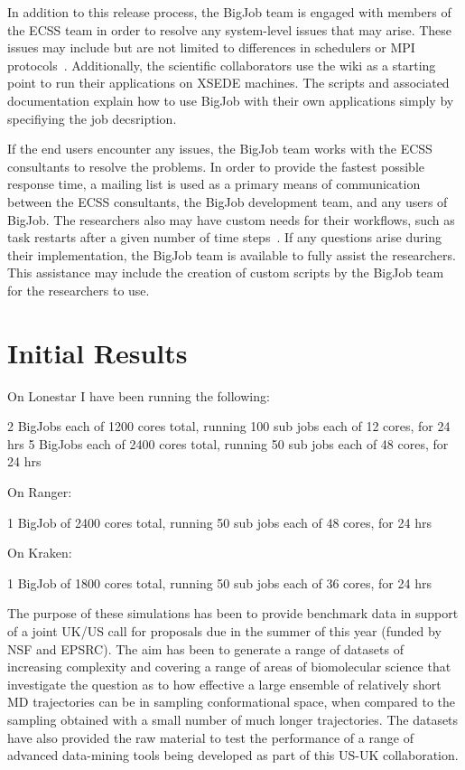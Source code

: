 \documentclass{sig-alternate}
\begin{document}
In addition to this release process, the BigJob team is engaged with members
of the ECSS team in order to resolve any system-level issues that may arise.
These issues may include but are not limited to differences in schedulers or MPI
protocols~. Additionally, the scientific collaborators use the wiki as a
starting point to run their applications on XSEDE machines. The scripts and
associated documentation explain how to use BigJob with their own applications
simply by specifiying the job decsription.~

If the end users encounter any issues, the BigJob team works with the ECSS
consultants to resolve the problems. In order to provide the fastest possible
response time, a mailing list is used as a primary means of communication
between the ECSS consultants, the BigJob development team, and any users of
BigJob. The researchers also may have custom needs for their workflows, such as
task restarts after a given number of time steps~. If any questions arise during their implementation, the BigJob
team is available to fully assist the researchers. This assistance may include
the creation of custom scripts by the BigJob team for the researchers to use.


\section{Initial Results} 

On Lonestar I have been running the following:

2 BigJobs each of 1200 cores total, running 100 sub jobs each of 12 cores, for
24 hrs
5 BigJobs each of 2400 cores total, running 50 sub jobs each of 48 cores, for 24
hrs

On Ranger:

1 BigJob of 2400 cores total, running 50 sub jobs each of 48 cores, for 24 hrs

On Kraken:

1 BigJob of 1800 cores total, running 50 sub jobs each of 36 cores, for 24 hrs

The purpose of these simulations has been to provide benchmark data in support
of a joint UK/US call for proposals due in the summer of this year (funded by
NSF and EPSRC). The aim has been to generate a range of datasets of increasing
complexity and covering a range of areas of biomolecular science that
investigate the question as to how effective a large ensemble of relatively
short MD trajectories can be in sampling conformational space, when compared to
the sampling obtained with a small number of much longer trajectories. The
datasets have also provided the raw material to test the performance of a range
of advanced data-mining tools being developed as part of this US-UK
collaboration.
\end{document}
